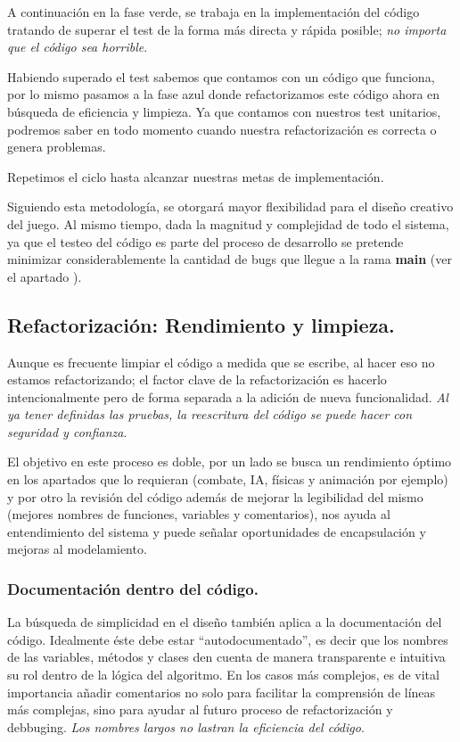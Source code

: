 A continuación en la fase verde, se trabaja en la implementación del código tratando de superar el test de la forma más directa y rápida posible; \textit{no importa que el código sea horrible}.

Habiendo superado el test sabemos que contamos con un código que funciona, por lo mismo pasamos a la fase azul donde refactorizamos este código ahora en búsqueda de eficiencia y limpieza. Ya que contamos con nuestros test unitarios, podremos saber en todo momento cuando nuestra refactorización es correcta o genera problemas.

Repetimos el ciclo hasta alcanzar nuestras metas de implementación.

Siguiendo esta metodología, se otorgará mayor flexibilidad para el diseño creativo del juego. Al mismo tiempo, dada la magnitud y complejidad de todo el sistema, ya que el testeo del código es parte del proceso de desarrollo se pretende minimizar considerablemente la cantidad de bugs que llegue a la rama \textbf{main} (ver el apartado ).

\subsection{Refactorización: Rendimiento y limpieza.}\label{principios:refactorizacion-rendimiento-limpieza}
Aunque es frecuente limpiar el código a medida que se escribe, al hacer eso no estamos refactorizando; el factor clave de la refactorización es hacerlo intencionalmente pero de forma separada a la adición de nueva funcionalidad. \emph{Al ya tener definidas las pruebas, la reescritura del código se puede hacer con seguridad y confianza}.

El objetivo en este proceso es doble, por un lado se busca un rendimiento óptimo en los apartados que lo requieran (combate, IA, físicas y animación por ejemplo) y por otro la revisión del código además de mejorar la legibilidad del mismo (mejores nombres de funciones, variables y comentarios), nos ayuda al entendimiento del sistema y puede señalar oportunidades de encapsulación y mejoras al modelamiento.

\subsubsection{Documentación dentro del código.}\label{principios:documentacion-en-codigo}
La búsqueda de simplicidad en el diseño también aplica a la documentación del código. Idealmente éste debe estar “autodocumentado”, es decir que los nombres de las variables, métodos y clases den cuenta de manera transparente e intuitiva su rol dentro de la lógica del algoritmo. En los casos más complejos, es de vital importancia añadir comentarios no solo para facilitar la comprensión de líneas más complejas, sino para ayudar al futuro proceso de refactorización y debbuging. \emph{Los nombres largos no lastran la eficiencia del código}.

